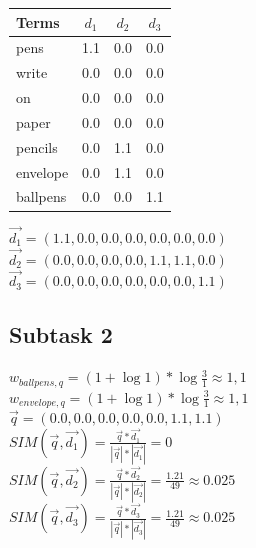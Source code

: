 \documentclass[a4paper]{scrartcl}
\begin{document}
\begin{tabular}{|l|c|c|c|}
    \hline
    \textbf{Terms} & \textbf{$d_1$} & \textbf{$d_2$} & \textbf{$d_3$} \\ \hline
    pens           & 1.1               & 0.0               & 0.0               \\ \hline
    write          & 0.0               & 0.0               & 0.0               \\ \hline
    on             & 0.0               & 0.0               & 0.0               \\ \hline
    paper          & 0.0               & 0.0               & 0.0               \\ \hline
    pencils        & 0.0               & 1.1               & 0.0               \\ \hline
    envelope       & 0.0               & 1.1               & 0.0               \\ \hline
    ballpens       & 0.0               & 0.0               & 1.1               \\ \hline
\end{tabular}
\newline
$\overrightarrow{d_1} = (1.1, 0.0, 0.0, 0.0, 0.0, 0.0, 0.0)$\\
$\overrightarrow{d_2} = (0.0, 0.0, 0.0, 0.0, 1.1, 1.1, 0.0)$\\
$\overrightarrow{d_3} = (0.0, 0.0, 0.0, 0.0, 0.0, 0.0, 1.1)$\\

\subsection*{Subtask 2}
$w_{ballpens, q} = (1+\log 1) * \log \frac{3}{1} \approx 1,1$\\
$w_{envelope, q} = (1+\log 1) * \log \frac{3}{1} \approx 1,1$\\

$\overrightarrow{q}=(0.0, 0.0, 0.0, 0.0, 0.0, 1.1, 1.1)$\\

$SIM(\overrightarrow{q}, \overrightarrow{d_1}) = \frac{\overrightarrow{q}*\overrightarrow{d_1}}{|\overrightarrow{q}|*|\overrightarrow{d_1}|}
= 0$\\
$SIM(\overrightarrow{q}, \overrightarrow{d_2}) = \frac{\overrightarrow{q}*\overrightarrow{d_2}}{|\overrightarrow{q}|*|\overrightarrow{d_2}|}
= \frac{1.21}{49} \approx  0.025$\\
$SIM(\overrightarrow{q}, \overrightarrow{d_3}) = \frac{\overrightarrow{q}*\overrightarrow{d_3}}{|\overrightarrow{q}|*|\overrightarrow{d_3}|}
= \frac{1.21}{49} \approx 0.025$\\
\end{document}
